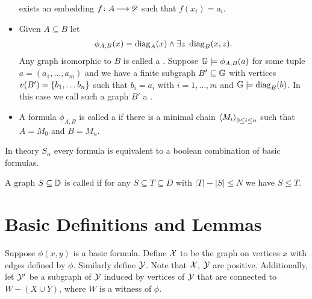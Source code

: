 \documentclass{amsart}
\begin{document}
\begin{Definition}
\begin{itemize}
    exists an embedding $f \colon A \operatorname{\longrightarrow} \mathscr D$ such that $f(x_i) = a_i$.
  \item Given $A \subseteq B$ let 
    \begin{align*}
      \phi_{A,B}(x) = \operatorname{diag}_A(x) \wedge \exists z \; \operatorname{diag}_B(x, z).
    \end{align*}
    Any graph isomorphic to $B$ is called a .
    Suppose $\mathbb G \models \phi_{A,B}(a)$ for some tuple $a = (a_1, \ldots, a_m)$
    and we have a finite subgraph $B' \subseteq \mathbb G$ with vertices $v(B') = \left\{b_1, \ldots b_n\right\}$
    such that $b_i = a_i$ with $i = 1, \ldots, m$ and $\mathbb G \models \operatorname{diag}_B(b)$.
    In this case we call such a graph $B'$ a .
  \item A formula $\phi_{A,B}$ is called a 
    if there is a minimal chain $\left\langle M_i \right\rangle_{0 \leq i \leq n}$
    such that $A = M_0$ and $B = M_n$.
  \end{itemize}
\end{Definition}

\begin{Theorem} 
  In theory $S_\alpha$ every formula is equivalent to a boolean combination of basic formulas.
\end{Theorem}

\begin{Definition}
  A graph $S \subseteq \mathbb D$ is called  if for any $S \subseteq T \subseteq D$ with $|T| - |S| \leq N$ we have $S \leq T$.
\end{Definition}

\section{Basic Definitions and Lemmas}
\begin{Definition} \label{def_basic}
  Suppose $\phi(x, y)$ is a basic formula.
  Define $\mathcal X$ to be the graph on vertices $x$ with edges defined by $\phi$.
  Similarly define $\mathcal Y$.
  Note that $\mathcal X$, $\mathcal Y$ are positive.
  Additionally, let $\mathcal Y'$ be a subgraph of $\mathcal Y$ induced by vertices of $\mathcal Y$ that are connected to $W - (X \cup Y)$, where $W$ is a witness of $\phi$.
\end{Definition}
\end{document}
